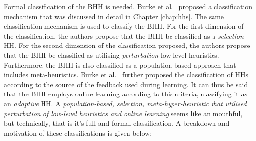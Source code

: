 Formal classification of the \Ac{BHH} is needed. Burke et al.~\cite{ref:burke:2010} proposed a classification mechanism that was discussed in detail in Chapter \ref{chap:hhs}. The same classification mechanism is used to classify the \ac{BHH}. For the first dimension of the classification, the authors propose that the \Ac{BHH} be classified as a \textit{selection} \ac{HH}. For the second dimension of the classification proposed, the authors propose that the \Ac{BHH} be classified as utilising \textit{perturbation} low-level heuristics. Furthermore, the \ac{BHH} is also classified as a population-based approach that includes meta-heuristics. Burke et al.~\cite{ref:burke:2010} further proposed the classification of \acp{HH} according to the source of the feedback used during learning. It can thus be said that the \ac{BHH} employs online learning according to this criteria, classifying it as an \textit{adaptive} \ac{HH}. A \textit{population-based, selection, meta-hyper-heuristic that utilised perturbation of low-level heuristics and online learning} seems like an mouthful, but technically, that is it's full and formal classification. A breakdown and motivation of these classifications is given below:

